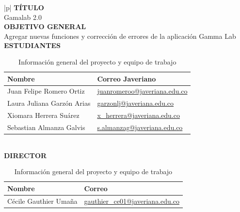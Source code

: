 \documentclass[12pt,letterpaper]{article}
\begin{document}

\thispagestyle{empty}

\begin{table}[H]
    \centering
    \noindent
    \begin{tabular}{|p{\textwidth}|}
    \hline
    \textbf{TÍTULO}\\
    Gamalab 2.0 \\
    \hline
    \textbf{OBJETIVO GENERAL}\\
    Agregar nuevas funciones y corrección de errores de la aplicación Gamma Lab \\
    \hline
    \textbf{ESTUDIANTES} \\
    \begin{tabular}{|p{6.5cm}|p{7.5cm}|}
        \hline
        \textbf{Nombre} & \textbf{Correo Javeriano} \\
        \hline
        Juan Felipe Romero Ortiz & \href{mailto:juanromeroo@javeriana.edu.co}{juanromeroo@javeriana.edu.co} \\
        Laura Juliana Garzón Arias & \href{mailto:garzonlj@javeriana.edu.co}{garzonlj@javeriana.edu.co} \\
        Xiomara Herrera Suárez & \href{mailto:x\_herrera@javeriana.edu.co}{x\_herrera@javeriana.edu.co} \\
        Sebastian Almanza Galvis & \href{mailto:s.almanzag@javeriana.edu.co}{s.almanzag@javeriana.edu.co} \\
        \hline
    \end{tabular} \\
    \hline
    \textbf{DIRECTOR} \\
    \begin{tabular}{|p{6.5cm}|p{7.5cm}|}
        \hline
        \textbf{Nombre} & \textbf{Correo} \\
        \hline
        Cécile Gauthier Umaña &
        \href{mailto:gauthier\_ce01@javeriana.edu.co}{gauthier\_ce01@javeriana.edu.co} \\
        \hline
    \end{tabular} \\
    \hline
    \end{tabular}
    
    \vspace{0.3cm} %
    \caption{Información general del proyecto y equipo de trabajo}
    \label{tab:informacion_general}
\end{table}
\end{document}
